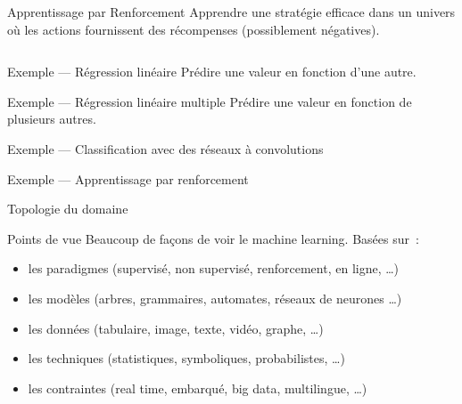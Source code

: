 \begin{frame}{Apprentissage par Renforcement}
  Apprendre une stratégie efficace dans un univers où les actions fournissent des récompenses (possiblement négatives).
  \vfill
  \begin{columns}[T]
    \begin{column}{0.5\textwidth}
    \end{column}
    \begin{column}{0.5\textwidth}
    \end{column}
  \end{columns}
\end{frame}

\begin{frame}{Exemple --- Régression linéaire}
  Prédire une valeur en fonction d'une autre.

\end{frame}

\begin{frame}{Exemple --- Régression linéaire multiple}
  Prédire une valeur en fonction de plusieurs autres.

\end{frame}

\begin{frame}{Exemple --- Classification avec des réseaux à convolutions}
\end{frame}

\begin{frame}{Exemple --- Apprentissage par renforcement}
\end{frame}

\begin{frame}{Topologie du domaine}
\end{frame}

\begin{frame}{Points de vue}
  Beaucoup de façons de voir le machine learning. Basées sur~:
  \begin{itemize}[<+->]
    \item les paradigmes (supervisé, non supervisé, renforcement, en
      ligne, …)
    \item les modèles (arbres, grammaires, automates, réseaux de
      neurones …)
    \item les données (tabulaire, image, texte, vidéo, graphe, …)
    \item les techniques (statistiques, symboliques, probabilistes, …)
    \item les contraintes (real time, embarqué, big data, multilingue,
      …)
  \end{itemize}

\end{frame}

